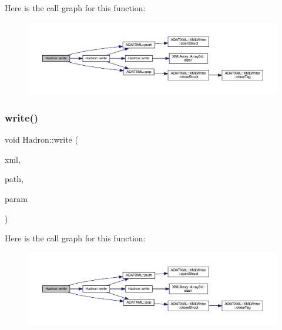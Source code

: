 Here is the call graph for this function\+:\nopagebreak
\begin{figure}[H]
\begin{center}
\leavevmode
\includegraphics[width=350pt]{d1/daf/namespaceHadron_ac03bbcefc730bcb21021dc5c45a1b365_cgraph}
\end{center}
\end{figure}
\mbox{\label{namespaceHadron_a005000ac92ae829ca325627dae07fb51}} 
\subsubsection{\texorpdfstring{write()}{write()}\hspace{0.1cm}{\footnotesize\ttfamily [36/95]}}
{\footnotesize\ttfamily void Hadron\+::write (\begin{DoxyParamCaption}\item[{\mbox{\hyperlink{classADATXML_1_1XMLWriter}{X\+M\+L\+Writer}} \&}]{xml,  }\item[{const std\+::string \&}]{path,  }\item[{const \mbox{\hyperlink{structHadron_1_1KeyHadronNPartIrrepOp__t_1_1CGPair__t_1_1Slot__t}{Key\+Hadron\+N\+Part\+Irrep\+Op\+\_\+t\+::\+C\+G\+Pair\+\_\+t\+::\+Slot\+\_\+t}} \&}]{param }\end{DoxyParamCaption})}

Here is the call graph for this function\+:\nopagebreak
\begin{figure}[H]
\begin{center}
\leavevmode
\includegraphics[width=350pt]{d1/daf/namespaceHadron_a005000ac92ae829ca325627dae07fb51_cgraph}
\end{center}
\end{figure}
\mbox{\label{namespaceHadron_ae38baf2d1cfe9fdaf455f274e722b32f}} 
